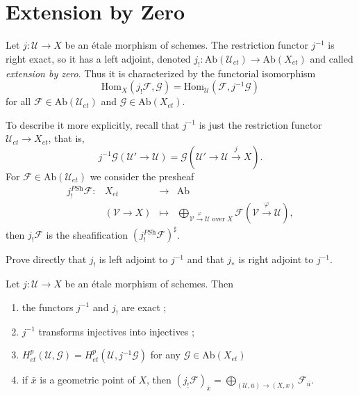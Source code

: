 \section{Extension by Zero}

\begin{definition}
Let $j: \mathcal{U} \to X$ be an \'etale morphism of schemes. The restriction 
functor $j^{-1}$ is right exact, so it has a left adjoint, denoted $j_! : 
\text{Ab}(\mathcal{U}_{et})\to \text{Ab}(X_{et})$ and called \emph{extension by 
zero}. Thus it is characterized by the functorial isomorphism
$$\text{Hom}_X(j_!\mathcal{F}, \mathcal{G}) = 
\text{Hom}_\mathcal{U}(\mathcal{F}, j^{-1}\mathcal{G})$$
for all $\mathcal{F} \in \text{Ab}(\mathcal{U}_{et})$ and $\mathcal{G} \in 
\text{Ab}(X_{et})$.
\end{definition}

To describe it more explicitly, recall that $j^{-1}$ is just the restriction 
functor $\mathcal{U}_{et}\to X_{et}$, that is, 
$$
j^{-1}\mathcal{G}(\mathcal{U}'\to \mathcal{U}) = \mathcal{G} 
\left(\mathcal{U}'\to \mathcal{U} \xrightarrow{j} X\right).$$
For $\mathcal{F} \in \text{Ab}(\mathcal{U}_{et})$ we consider the presheaf
$$
\begin{array}{rrcl}
j_!^{\textit{PSh}}\mathcal{F}: & X_{et} &\longrightarrow & \text{Ab}\\
& (\mathcal{V}\to X) & \longmapsto & \displaystyle 
\bigoplus_{\mathcal{V}\xrightarrow{\varphi} \mathcal{U}\text{ over }X} 
\mathcal{F}(\mathcal{V}\xrightarrow{\varphi}\mathcal{U}),
\end{array}
$$
then $j_!\mathcal{F}$ is the sheafification 
$\left(j_!^{\textit{PSh}}\mathcal{F}\right)^\sharp$.

\begin{exercise}
Prove directly that $j_!$ is left adjoint to $j^{-1}$ and that $j_*$ is right 
adjoint to $j^{-1}$.
\end{exercise}

\begin{proposition}
Let $j : \mathcal{U} \to X$ be an \'etale morphism of schemes. Then
\begin{enumerate}
\item the functors $j^{-1}$ and $j_!$ are exact ;
\item $j^{-1}$ transforms injectives into injectives ;
\item $H_{et}^p(\mathcal{U}, \mathcal{G})= H_{et}^p(\mathcal{U}, 
j^{-1}\mathcal{G})$ for any $\mathcal{G} \in \text{Ab}(X_{et})$
\item if $\bar x$ is a geometric point of $X$, then 
$\left(j_!\mathcal{F}\right)_{\bar x} =\displaystyle \bigoplus_{(\mathcal{U}, 
\bar u) \to (X, x)} \mathcal{F}_{\bar{u}}$.
\end{enumerate}
\end{proposition}

